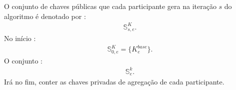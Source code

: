 
O conjunto de chaves públicas que cada participante gera na iteração $s$ do algoritmo
é denotado por :
\begin{align*}
\mathbb{S}^K_{s,e} .
\end{align*}
No início :
\begin{align*}
\mathbb{S}^K_{0,e} = \{K^{base}_e\} .
\end{align*}
O conjunto :
\begin{align*}
\mathbb{S}^{k}_{e} .
\end{align*}
Irá no fim, conter as chaves privadas de agregação de cada participante. 
